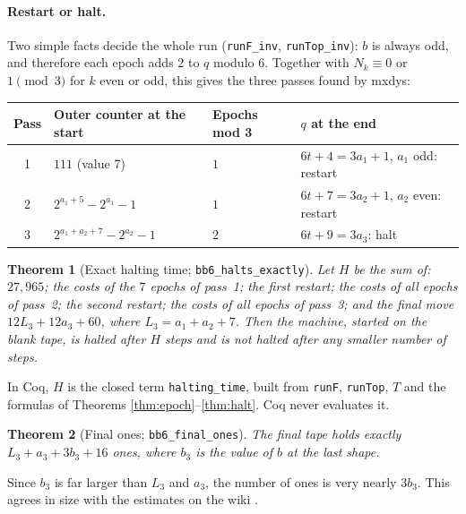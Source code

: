 \documentclass[11pt]{article}
\newtheorem{theorem}{Theorem}
\theoremstyle{remark}
\newcommand{\coq}[1]{\texttt{#1}}
\begin{document}
\paragraph{Restart or halt.} Two simple facts decide the whole run
(\coq{runF\_inv}, \coq{runTop\_inv}): $b$ is always odd, and therefore each
epoch adds $2$ to $q$ modulo $6$. Together with $N_k \equiv 0$ or $1 \pmod 3$
for $k$ even or odd, this gives the three passes found by mxdys:
\begin{center}
\begin{tabular}{clll}
\toprule
Pass & Outer counter at the start & Epochs mod 3 & $q$ at the end\\
\midrule
1 & $111$ (value 7) & $1$ & $6t+4 = 3a_1+1$, $a_1$ odd: restart\\
2 & $2^{a_1+5}-2^{a_1}-1$ & $1$ & $6t+7 = 3a_2+1$, $a_2$ even: restart\\
3 & $2^{a_1+a_2+7}-2^{a_2}-1$ & $2$ & $6t+9 = 3a_3$: halt\\
\bottomrule
\end{tabular}
\end{center}

\begin{theorem}[Exact halting time; \coq{bb6\_halts\_exactly}]\label{thm:main}
Let $H$ be the sum of: $27{,}965$; the costs of the $7$ epochs of pass~1; the
first restart; the costs of all epochs of pass~2; the second restart; the costs
of all epochs of pass~3; and the final move $12L_3+12a_3+60$, where
$L_3 = a_1+a_2+7$. Then the machine, started on the blank tape, is halted after
$H$ steps and is not halted after any smaller number of steps.
\end{theorem}

In Coq, $H$ is the closed term \coq{halting\_time}, built from \coq{runF},
\coq{runTop}, $T$ and the formulas of Theorems
\ref{thm:epoch}--\ref{thm:halt}. Coq never evaluates it.

\begin{theorem}[Final ones; \coq{bb6\_final\_ones}]\label{thm:ones}
The final tape holds exactly $L_3 + a_3 + 3b_3 + 16$ ones, where $b_3$ is the
value of $b$ at the last shape.
\end{theorem}

Since $b_3$ is far larger than $L_3$ and $a_3$, the number of ones is very
nearly $3b_3$. This agrees in size with the estimates on the wiki \cite{wiki}.
\end{document}
